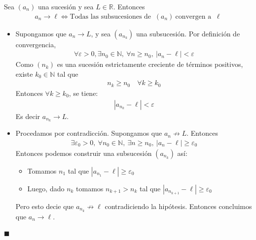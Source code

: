 \documentclass[12pt]{book}
\renewenvironment{proof}[1][\textit{Demostración}]{%
  \par\noindent{\bfseries #1.}\enspace}{\hfill$\blacksquare$\par}
\begin{document}
 \begin{prop}{}{}
    Sea $(a_n)$ una sucesión y sea $L \in \mathbb{R}$. Entonces
     \begin{align*}
         a_n \to \ell \Longleftrightarrow \text{Todas las subsucesiones de } \ (a_n) \ \text{convergen a } \ \ell
     \end{align*}
 \end{prop}
 \begin{proof}
     \begin{itemize}
         \item[$(\Longrightarrow)$] Supongamos que $a_n \to L$, y sea $(a_{n_k})$ una subsucesión. Por definición de convergencia, 
         \begin{align*}
             \forall \varepsilon>0, \exists n_0 \in \mathbb{N}, \ \forall n \geq n_0, \ |a_n - \ell| < \varepsilon
         \end{align*}
         Como $(n_k)$ es una sucesión estrictamente creciente de términos positivos, existe $k_0 \in \mathbb{N}$ tal que 
         \begin{align*}
             n_k \geq n_0 \quad \forall k \geq k_0
         \end{align*}
         Entonces $\forall k \geq k_0$, se tiene:
         \begin{align*}
             |a_{n_k}-\ell| < \varepsilon
         \end{align*}
         Es decir $a_{n_k} \to L$.

        \item[$(\Longleftarrow)$] Procedamos por contradicción. Supongamos que $a_n \not\to L$. Entonces 
        \begin{align*}
            \exists \varepsilon_0 >0, \ \forall n_0 \in \mathbb{N}, \ \exists n \geq n_0, \ |a_n - \ell| \geq \varepsilon_0
        \end{align*}
Entonces podemos construir una subsucesión $(a_{n_k})$ así:
\begin{itemize}
    \item Tomamos $n_1$ tal que $|a_{n_1}-\ell| \geq \varepsilon_0$

    \item Luego, dado $n_k$ tomamos $n_{k+1} > n_k$ tal que $|a_{n_{k+1}}-\ell | \geq \varepsilon_0$
\end{itemize}
Pero esto decie que $a_{n_k} \not\to \ell$ contradiciendo la hipótesis. Entonces concluimos que $a_n \to \ell$.
     \end{itemize}
 \end{proof}
\end{document}

